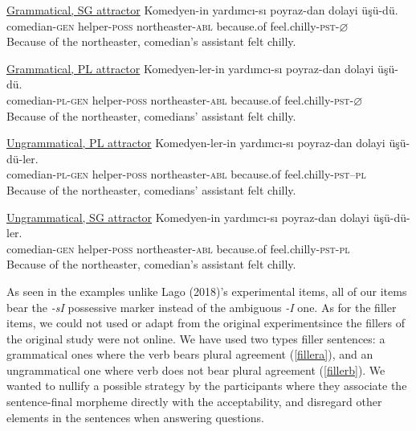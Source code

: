 \documentclass[11pt,a4paper]{article}
\begin{document}
\begin{exe}
\ex
\begin{xlist}
\ex \underline{Grammatical, SG attractor} \label{exp1}
\gll Komedyen-in yard{\i}mc{\i}-s{\i} poyraz-dan dolayi \"{u}\c{s}\"{u}-d\"{u}.\\
comedian-\textsc{gen} helper-\textsc{poss} northeaster-\textsc{abl} because.of feel.chilly-\textsc{pst}-$\varnothing$\\
\glt Because of the northeaster, comedian's assistant felt chilly.

\ex \underline{Grammatical, PL attractor} \label{exp2}
\gll Komedyen-ler-in yard{\i}mc{\i}-s{\i} poyraz-dan dolayi \"{u}\c{s}\"{u}-d\"{u}.\\
comedian-\textsc{pl}-\textsc{gen} helper-\textsc{poss} northeaster-\textsc{abl} because.of feel.chilly-\textsc{pst}-$\varnothing$\\
\glt Because of the northeaster, comedians' assistant felt chilly.

\ex \underline{Ungrammatical, PL attractor} \label{exp3}
\gll Komedyen-ler-in yard{\i}mc{\i}-s{\i} poyraz-dan dolayi \"{u}\c{s}\"{u}-d\"{u}-ler.\\
comedian-\textsc{pl}-\textsc{gen} helper-\textsc{poss} northeaster-\textsc{abl} because.of feel.chilly-\textsc{pst}--\textsc{pl}\\
\glt Because of the northeaster, comedians' assistant felt chilly.

\ex \underline{Ungrammatical, SG attractor} \label{exp4}
\gll Komedyen-in yard{\i}mc{\i}-s{\i} poyraz-dan dolayi \"{u}\c{s}\"{u}-d\"{u}-ler.\\
comedian-\textsc{gen} helper-\textsc{poss} northeaster-\textsc{abl} because.of feel.chilly-\textsc{pst}-\textsc{pl}\\
\glt Because of the northeaster, comedian's assistant felt chilly.

\end{xlist}
\end{exe}

As seen in the examples unlike Lago (2018)'s experimental items, all of
our items bear the \emph{-sI} possessive marker instead of the ambiguous
\emph{-I} one. As for the filler items, we could not used or adapt from
the original experimentsince the fillers of the original study were not
online. We have used two types filler sentences: a grammatical ones
where the verb bears plural agreement (\ref{fillera}), and an
ungrammatical one where verb does not bear plural agreement
(\ref{fillerb}). We wanted to nullify a possible strategy by the
participants where they associate the sentence-final morpheme directly
with the acceptability, and disregard other elements in the sentences
when answering questions.
\end{document}
